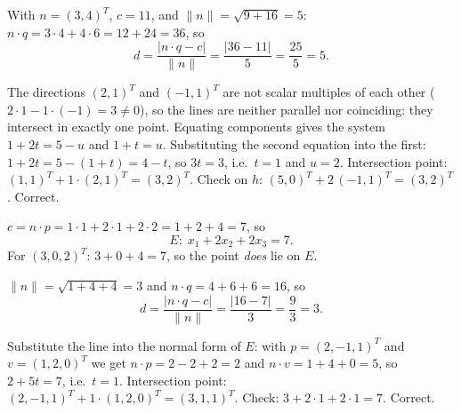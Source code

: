 \begin{solutions}
  \item With $n = (3, 4)^{T}$, $c = 11$, and $\|n\| = \sqrt{9 + 16} = 5$:
        $n \cdot q = 3 \cdot 4 + 4 \cdot 6 = 12 + 24 = 36$, so
        \[
        d = \frac{|n \cdot q - c|}{\|n\|} = \frac{|36 - 11|}{5}
        = \frac{25}{5} = 5 .
        \]

  \item The directions $(2, 1)^{T}$ and $(-1, 1)^{T}$ are not scalar
        multiples of each other ($2 \cdot 1 - 1 \cdot (-1) = 3 \neq 0$),
        so the lines are neither parallel nor coinciding: they intersect
        in exactly one point. Equating components gives the system
        $1 + 2 t = 5 - u$ and $1 + t = u$. Substituting the second
        equation into the first: $1 + 2 t = 5 - (1 + t) = 4 - t$, so
        $3 t = 3$, i.e.\ $t = 1$ and $u = 2$. Intersection point:
        $(1, 1)^{T} + 1 \cdot (2, 1)^{T} = (3, 2)^{T}$. Check on $h$:
        $(5, 0)^{T} + 2 \, (-1, 1)^{T} = (3, 2)^{T}$. Correct.

  \item $c = n \cdot p = 1 \cdot 1 + 2 \cdot 1 + 2 \cdot 2 = 1 + 2 + 4
        = 7$, so
        \[
        E\colon\; x_{1} + 2 x_{2} + 2 x_{3} = 7 .
        \]
        For $(3, 0, 2)^{T}$: $3 + 0 + 4 = 7$, so the point \emph{does}
        lie on $E$.

  \item $\|n\| = \sqrt{1 + 4 + 4} = 3$ and
        $n \cdot q = 4 + 6 + 6 = 16$, so
        \[
        d = \frac{|n \cdot q - c|}{\|n\|} = \frac{|16 - 7|}{3}
        = \frac{9}{3} = 3 .
        \]

  \item Substitute the line into the normal form of $E$: with
        $p = (2, -1, 1)^{T}$ and $v = (1, 2, 0)^{T}$ we get
        $n \cdot p = 2 - 2 + 2 = 2$ and $n \cdot v = 1 + 4 + 0 = 5$, so
        $2 + 5 t = 7$, i.e.\ $t = 1$. Intersection point:
        $(2, -1, 1)^{T} + 1 \cdot (1, 2, 0)^{T} = (3, 1, 1)^{T}$.
        Check: $3 + 2 \cdot 1 + 2 \cdot 1 = 7$. Correct.
\end{solutions}
